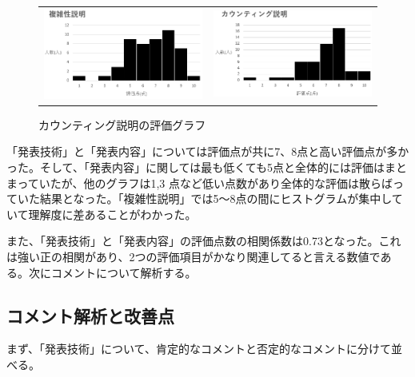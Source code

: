\begin{figure}[h]
 \begin{tabular}{cc}
  \begin{minipage}[h]{0.45\hsize}
  \centering
 \includegraphics[width=0.7\linewidth]{./figure/evaluation_final-hukuzatusei.jpg}
\caption{複雑性説明の評価グラフ}
\label{evaluation_final-hukuzatusei}
 \end{minipage} &

\begin{minipage}[h]{0.45\hsize}
  \centering
 \includegraphics[width=0.7\linewidth]{./figure/evaluation_final-counting.jpg}
 \caption{カウンティング説明の評価グラフ}
\label{evaluation_final-counting}
\end{minipage} 
\end{tabular}
\end{figure}

「発表技術」と「発表内容」については評価点が共に7、8点と高い評価点が多かった。そして、「発表内容」に関しては最も低くても5点と全体的には評価はまとまっていたが、他のグラフは1,3
点など低い点数があり全体的な評価は散らばっていた結果となった。「複雑性説明」では5～8点の間にヒストグラムが集中していて理解度に差あることがわかった。

また、「発表技術」と「発表内容」の評価点数の相関係数は0.73となった。これは強い正の相関があり、2つの評価項目がかなり関連してると言える数値である。次にコメントについて解析する。

\subsection{コメント解析と改善点}
まず、「発表技術」について、肯定的なコメントと否定的なコメントに分けて並べる。

